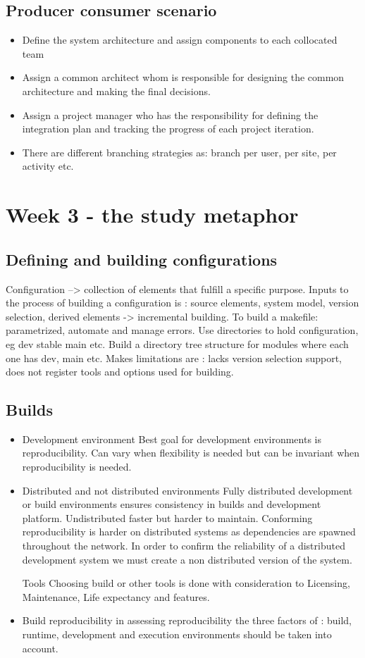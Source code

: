 \documentclass{article}
\begin{document}
\subsection{Producer consumer scenario}
\begin{itemize}
    \item Define the system architecture and assign components to each collocated team
    \item Assign a common architect whom is responsible for designing the common architecture and making the final decisions.
    \item Assign a project manager who has the responsibility for defining the integration plan and tracking the progress of each project iteration.
    \item There are different branching strategies as: branch per user, per site, per activity etc.
\end{itemize}

\section{ Week 3 - the study metaphor}
\subsection{Defining and building configurations} 
Configuration --> collection of elements that fulfill a specific purpose. Inputs to the process of building a configuration is : source elements, system model, version selection, derived elements -> incremental building.
To build a makefile: parametrized, automate and manage errors. Use directories to hold configuration, eg dev stable main etc. Build a directory tree structure for modules where each one has dev, main etc.
Makes limitations are : lacks version selection support, does not register tools and options used for building.

\subsection{Builds}
\begin{itemize}
    \item Development environment Best goal for development environments is reproducibility. Can vary when flexibility is needed but can be invariant when reproducibility is needed.
    \item Distributed and not distributed environments Fully distributed development or build environments ensures consistency in builds and development platform. Undistributed faster but harder to maintain.
    Conforming reproducibility is harder on distributed systems as dependencies are spawned throughout the network. In order to confirm the reliability of a distributed development system we must create a non distributed version of the system.
    \item[Tools] Choosing build or other tools is done with consideration to Licensing, Maintenance, Life expectancy and features. 
    \item Build reproducibility  in assessing reproducibility the three factors of : build, runtime, development and execution environments should be taken into account.
\end{itemize}
\end{document}
